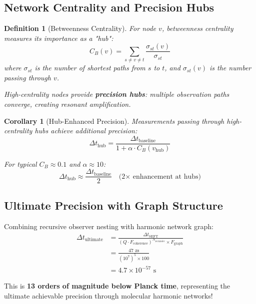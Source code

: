 \documentclass[12pt,a4paper]{article}
\newtheorem{definition}[theorem]{Definition}
\newtheorem{corollary}[theorem]{Corollary}
\begin{document}
\subsection{Network Centrality and Precision Hubs}

\begin{definition}[Betweenness Centrality]
For node $v$, betweenness centrality measures its importance as a "hub":
\begin{equation}
C_B(v) = \sum_{s \neq v \neq t} \frac{\sigma_{st}(v)}{\sigma_{st}}
\end{equation}
where $\sigma_{st}$ is the number of shortest paths from $s$ to $t$, and $\sigma_{st}(v)$ is the number passing through $v$.

High-centrality nodes provide \textbf{precision hubs}: multiple observation paths converge, creating resonant amplification.
\end{definition}

\begin{corollary}[Hub-Enhanced Precision]
Measurements passing through high-centrality hubs achieve additional precision:
\begin{equation}
\Delta t_{\text{hub}} = \frac{\Delta t_{\text{baseline}}}{1 + \alpha \cdot C_B(v_{\text{hub}})}
\end{equation}

For typical $C_B \approx 0.1$ and $\alpha \approx 10$:
\begin{equation}
\Delta t_{\text{hub}} \approx \frac{\Delta t_{\text{baseline}}}{2} \quad \text{(2× enhancement at hubs)}
\end{equation}
\end{corollary}

\subsection{Ultimate Precision with Graph Structure}

Combining recursive observer nesting with harmonic network graph:
\begin{align}
\Delta t_{\text{ultimate}} &= \frac{\Delta t_{\text{SEFT}}}{(Q \cdot F_{\text{coherence}})^{N_{\text{recursive}}} \times F_{\text{graph}}} \\
&= \frac{47 \text{ zs}}{(10^7)^5 \times 100} \\
&= 4.7 \times 10^{-57} \text{ s}
\end{align}

This is \textbf{13 orders of magnitude below Planck time}, representing the ultimate achievable precision through molecular harmonic networks!
\end{document}
